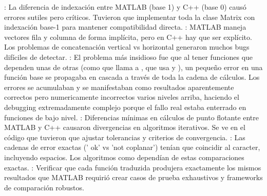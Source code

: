 \markdownRendererDocumentBegin
{}: La diferencia de indexación entre MATLAB (base 1) y C++ (base 0) causó errores sutiles pero críticos. Tuvieron que implementar toda la clase Matrix con indexación base-1 para mantener compatibilidad directa.\markdownRendererInterblockSeparator
{}: MATLAB maneja vectores fila y columna de forma implícita, pero en C++ hay que ser explícito. Los problemas de concatenación vertical vs horizontal generaron muchos bugs difíciles de detectar.\markdownRendererInterblockSeparator
{}: El problema más insidioso fue que al tener funciones que dependen unas de otras (como  que llama a , que usa  y ), un pequeño error en una función base se propagaba en cascada a través de toda la cadena de cálculos. Los errores se acumulaban y se manifestaban como resultados aparentemente correctos pero numericamente incorrectos varios niveles arriba, haciendo el debugging extremadamente complejo porque el fallo real estaba enterrado en funciones de bajo nivel.\markdownRendererInterblockSeparator
{}: Diferencias mínimas en cálculos de punto flotante entre MATLAB y C++ causaron divergencias en algoritmos iterativos. Se ve en el código que tuvieron que ajustar tolerancias y criterios de convergencia.\markdownRendererInterblockSeparator
{}: Las cadenas de error exactas (' ok' vs 'not coplanar') tenían que coincidir al caracter, incluyendo espacios. Los algoritmos como  dependían de estas comparaciones exactas.\markdownRendererInterblockSeparator
{}: Verificar que cada función traduzida produjera exactamente los mismos resultados que MATLAB requirió crear casos de prueba exhaustivos y frameworks de comparación robustos.\markdownRendererDocumentEnd